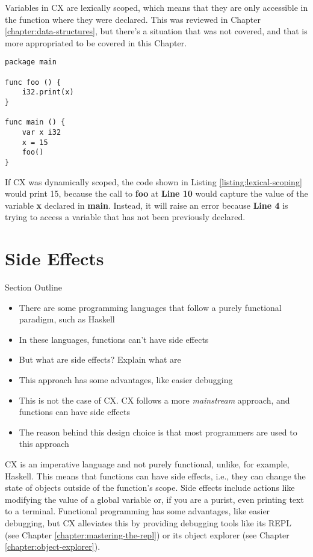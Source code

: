 \documentclass[11pt,fleqn,openany]{book} %
\begin{document}
Variables in CX are lexically scoped, which means that they are only accessible in the function where they were declared. This was reviewed in Chapter \ref{chapter:data-structures}, but there's a situation that was not covered, and that is more appropriated to be covered in this Chapter.

\begin{lstlisting}[caption={Lexical Scoping},captionpos=b,label={listing:lexical-scoping}]
package main

func foo () {
	i32.print(x)
}

func main () {
	var x i32
    x = 15
    foo()
}
\end{lstlisting}

If CX was dynamically scoped, the code shown in Listing \ref{listing:lexical-scoping} would print 15, because the call to \textbf{foo} at \textbf{Line 10} would capture the value of the variable \textbf{x} declared in \textbf{main}. Instead, it will raise an error because \textbf{Line 4} is trying to access a variable that has not been previously declared.

\section{Side Effects}

\begin{remark}
Section Outline
    \begin{itemize}
    	\item There are some programming languages that follow a purely functional paradigm, such as Haskell
        \item In these languages, functions can't have side effects
        \item But what are side effects? Explain what are
        \item This approach has some advantages, like easier debugging
        \item This is not the case of CX. CX follows a more \textit{mainstream} approach, and functions can have side effects
        \item The reason behind this design choice is that most programmers are used to this approach
    \end{itemize}
\end{remark}

CX is an imperative language and not purely functional, unlike, for example, Haskell. This means that functions can have side effects, i.e., they can change the state of objects outside of the function's scope. Side effects include actions like modifying the value of a global variable or, if you are a purist, even printing text to a terminal. Functional programming has some advantages, like easier debugging, but CX alleviates this by providing debugging tools like its REPL (see Chapter \ref{chapter:mastering-the-repl}) or its object explorer (see Chapter \ref{chapter:object-explorer}).
\end{document}
